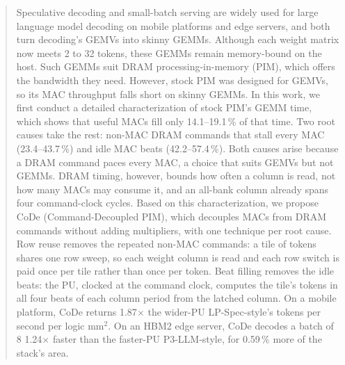 \begin{abstract}
Speculative decoding and small-batch serving are widely used for large language model decoding on mobile platforms and
edge servers, and both turn decoding's GEMVs into skinny GEMMs. Although each weight matrix now meets 2 to 32 tokens,
these GEMMs remain memory-bound on the host. Such GEMMs suit DRAM processing-in-memory (PIM), which offers the bandwidth
they need. However, stock PIM was designed for GEMVs, so its MAC throughput falls short on skinny GEMMs. In this work, we
first conduct a detailed characterization of stock PIM's GEMM time, which shows that useful MACs fill only
14.1--19.1\,\% of that time. Two root causes take the rest: non-MAC DRAM commands that stall every MAC
(23.4--43.7\,\%) and idle MAC beats (42.2--57.4\,\%). Both causes arise because a DRAM command paces every MAC, a choice
that suits GEMVs but not GEMMs. DRAM timing, however, bounds how often a column is read, not how many MACs may consume it, and an all-bank column already spans four
command-clock cycles. Based on this characterization, we propose CoDe (Command-Decoupled PIM), which decouples MACs from DRAM
commands without adding multipliers, with one technique per root cause. Row reuse removes the repeated non-MAC
commands: a tile of tokens shares one row sweep, so each weight column is read and each row switch is paid once per
tile rather than once per token. Beat filling removes the idle beats: the PU, clocked at the command clock, computes
the tile's tokens in all four beats of each column period from the latched column. On a mobile platform, CoDe returns
1.87$\times$ the wider-PU LP-Spec-style's tokens per second per logic mm$^2$. On an HBM2 edge server, CoDe decodes a
batch of 8 1.24$\times$ faster than the faster-PU P3-LLM-style, for 0.59\,\% more of the stack's area.
\end{abstract}
